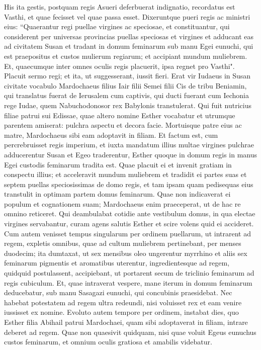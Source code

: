 \begin{biblechapter} 
\verse His ita gestis, postquam regis Asueri deferbuerat indignatio, recordatus est Vasthi, et quae fecisset vel quae passa esset. 
\verse Dixeruntque pueri regis ac ministri eius: “Quaerantur regi puellae virgines ac speciosae, 
\verse et constituantur, qui considerent per universas provincias puellas speciosas et virgines et adducant eas ad civitatem Susan et tradant in domum feminarum sub manu Egei eunuchi, qui est praepositus et custos mulierum regiarum; et accipiant mundum muliebrem. 
\verse Et, quaecumque inter omnes oculis regis placuerit, ipsa regnet pro Vasthi". Placuit sermo regi; et ita, ut suggesserant, iussit fieri. 
\verse Erat vir Iudaeus in Susan civitate vocabulo Mardochaeus filius Iair filii Semei filii Cis de tribu Beniamin, 
\verse qui translatus fuerat de Ierusalem cum captivis, qui ducti fuerant cum Iechonia rege Iudae, quem Nabuchodonosor rex Babylonis transtulerat. 
\verse Qui fuit nutricius filiae patrui sui Edissae, quae altero nomine Esther vocabatur et utrumque parentem amiserat: pulchra aspectu et decora facie. Mortuisque patre eius ac matre, Mardochaeus sibi eam adoptavit in filiam. 
\verse Et factum est, cum percrebruisset regis imperium, et iuxta mandatum illius multae virgines pulchrae adducerentur Susan et Egeo traderentur, Esther quoque in domum regis in manus Egei custodis feminarum tradita est. 
\verse Quae placuit ei et invenit gratiam in conspectu illius; et acceleravit mundum muliebrem et tradidit ei partes suas et septem puellas speciosissimas de domo regis, et tam ipsam quam pedisequas eius transtulit in optimam partem domus feminarum. 
\verse Quae non indicaverat ei populum et cognationem suam; Mardochaeus enim praeceperat, ut de hac re omnino reticeret. 
\verse Qui deambulabat cotidie ante vestibulum domus, in qua electae virgines servabantur, curam agens salutis Esther et scire volens quid ei accideret. 
\verse Cum autem venisset tempus singularum per ordinem puellarum, ut intrarent ad regem, expletis omnibus, quae ad cultum muliebrem pertinebant, per menses duodecim; ita dumtaxat, ut sex mensibus oleo ungerentur myrrhino et aliis sex feminarum pigmentis et aromatibus uterentur, 
\verse ingredientesque ad regem, quidquid postulassent, accipiebant, ut portarent secum de triclinio feminarum ad regis cubiculum. 
\verse Et, quae intraverat vespere, mane iterum in domum feminarum deducebatur, sub manu Sasagazi eunuchi, qui concubinis praesidebat. Nec habebat potestatem ad regem ultra redeundi, nisi voluisset rex et eam venire iussisset ex nomine. 
\verse Evoluto autem tempore per ordinem, instabat dies, quo Esther filia Abihail patrui Mardochaei, quam sibi adoptaverat in filiam, intrare deberet ad regem. Quae non quaesivit quidquam, nisi quae voluit Egeus eunuchus custos feminarum, et omnium oculis gratiosa et amabilis videbatur. 

\end{biblechapter}
